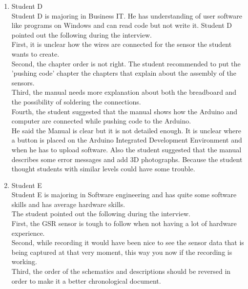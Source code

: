 \documentclass[conference]{IEEEtran}
\begin{document}
\begin{enumerate}
\begin{enumerate}
					\item Student D\\
					Student D is majoring in Business IT. He has understanding of user software like programs on Windows and can read code but not write it. Student D pointed out the following during the interview.\\
					First, it is unclear how the wires are connected for the sensor the student wants to create.\\
					Second, the chapter order is not right. The student recommended to put the 'pushing code' chapter the chapters that explain about the assembly of the sensors.\\
					Third, the manual needs more explanation about both the breadboard and the possibility of soldering the connections.\\
					Fourth, the student suggested that the manual shows how the Arduino and computer are connected while pushing code to the Arduino.\\
					He said the Manual is clear but it is not detailed enough. It is unclear where a button is placed on the Arduino Integrated Development Environment and when he has to upload software. Also the student suggested that the manual describes some error messages and add 3D photographs. Because the student thought students with similar levels could have some trouble. \\
					
					\item Student E\\
					Student E is majoring in Software engineering and has quite some software skills and has average hardware skills.\\
					The student pointed out the following during the interview.\\
					First, the GSR sensor is tough to follow when not having a lot of hardware experience.\\
					Second, while recording it would have been nice to see the sensor data that is being captured at that very moment, this way you now if the recording is working.\\
					Third, the order of the schematics and descriptions should be reversed in order to make it a better chronological document.\\
					

\end{enumerate}
\end{enumerate}
\end{document}
